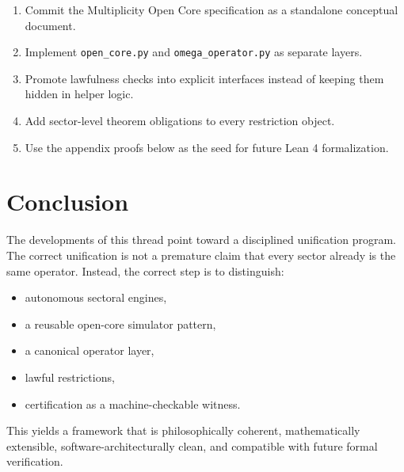 \documentclass[11pt]{article}
\theoremstyle{plain}
\theoremstyle{definition}
\theoremstyle{remark}
\begin{document}
\begin{enumerate}[label=\textbf{R\arabic*.}]
    \item Commit the Multiplicity Open Core specification as a standalone conceptual document.
    \item Implement \texttt{open\_core.py} and \texttt{omega\_operator.py} as separate layers.
    \item Promote lawfulness checks into explicit interfaces instead of keeping them hidden in helper logic.
    \item Add sector-level theorem obligations to every restriction object.
    \item Use the appendix proofs below as the seed for future Lean 4 formalization.
\end{enumerate}

\section{Conclusion}

The developments of this thread point toward a disciplined unification program. The correct unification is not a premature claim that every sector already is the same operator. Instead, the correct step is to distinguish:
\begin{itemize}
    \item autonomous sectoral engines,
    \item a reusable open-core simulator pattern,
    \item a canonical operator layer,
    \item lawful restrictions,
    \item certification as a machine-checkable witness.
\end{itemize}

This yields a framework that is philosophically coherent, mathematically extensible, software-architecturally clean, and compatible with future formal verification.


 \appendix
 \renewcommand{\thesection}{\Alph{section}}
\renewcommand{\theequation}{\Alph{section}.\arabic{equation}}
   \renewcommand{\thetheorem}{\Alph{section}.\arabic{theorem}}
   \renewcommand{\thelemma}{\Alph{section}.\arabic{lemma}}
   \renewcommand{\theproposition}{\Alph{section}.\arabic{proposition}}
   \renewcommand{\thecorollary}{\Alph{section}.\arabic{corollary}}
   \setcounter{equation}{0}
   \setcounter{theorem}{0}
\end{document}
